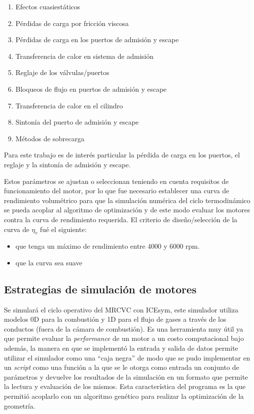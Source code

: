 \begin{enumerate}
    \item Efectos cuasiestáticos
    \item Pérdidas de carga por fricción viscosa
    \item Pérdidas de carga en los puertos de admisión y escape
    \item Transferencia de calor en sistema de admisión
    \item Reglaje de los válvulas/puertos
    \item Bloqueos de flujo en puertos de admisión y escape
    \item Transferencia de calor en el cilindro
    \item Sintonía del puerto de admisión y escape
    \item Métodos de sobrecarga 
\end{enumerate}

Para este trabajo es de interés particular la pérdida de carga en los puertos,
el reglaje y la sintonía de admisión y escape.
%
%

Estos parámetros se ajustan o seleccionan teniendo en cuenta requisitos de
funcionamiento del motor, por lo que fue necesario establecer una curva de
rendimiento volumétrico para que la simulación numérica del
ciclo termodinámico se pueda acoplar al algoritmo de optimización y de este
modo evaluar los motores contra la curva de rendimiento requerida.
%
El criterio de diseño/selección de la curva de $\eta_v$ fué el siguiente:

\begin{itemize}
  \item que tenga un máximo de rendimiento entre 4000 y 6000 rpm.
  \item que la curva sea suave
\end{itemize}

\subsection{Estrategias de simulación de motores}
%
Se simulará el ciclo operativo del MRCVC con ICEsym, este simulador utiliza
modelos 0D para la combustión y 1D para el flujo de gases a través de los
conductos (fuera de la cámara de combustión).
%
Es una herramienta muy útil ya que permite evaluar la \emph{performance}
de un motor a un costo computacional bajo además, la manera en que se
implementó la entrada y salida de datos permite utilizar el simulador como una
``caja negra'' de modo que se pudo implementar en un \emph{script} como una
función a la que se le otorga como entrada un conjunto de parámetros y devuelve
los resultados de la simulación en un formato que permite la lectura y
evaluación de los mismos.
%
Esta característica del programa es la que permitió acoplarlo con un algoritmo
genético para realizar la optimización de la geometría.


